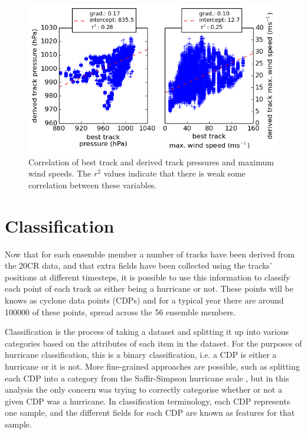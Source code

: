 \documentclass[pdftex,12pt,a4paper]{report}
\begin{document}
\begin{figure}[ht!]
    \centering
    \includegraphics[width=\textwidth]{figures/press_max_ws_corr_2005}
    \vspace{-10pt}
    \caption{Correlation of best track and derived track pressures and maximum wind speeds. The
        $r^2$ values indicate that there is weak some correlation between these variables. }
    \label{fig:press_max_ws_corr_2005}
\end{figure}

\newpage
\section{Classification}
\label{sec:classification}

Now that for each ensemble member a number of tracks have been derived from the 20CR data, and that
extra fields have been collected using the tracks' positions at different timesteps, it is possible
to use this information to classify each point of each track as either being a hurricane or not.
These points will be knows as cyclone data points (CDPs) and for a typical year there are around
100000 of these points, spread across the 56 ensemble members.

Classification is the process of taking a dataset and splitting it up into various categories based
on the attributes of each item in the dataset. For the purposes of hurricane classification, this is
a binary classification, i.e. a CDP is either a hurricane or it is not. More fine-grained approaches
are possible, such as splitting each CDP into a category from the Saffir-Simpson hurricane scale
\parencite{simpson1974hurricane}, but in this analysis the only concern was trying to correctly
categorise whether or not a given CDP was a hurricane. In classification terminology, each CDP
represents one sample, and the different fields for each CDP are known as features for that sample.
\end{document}
